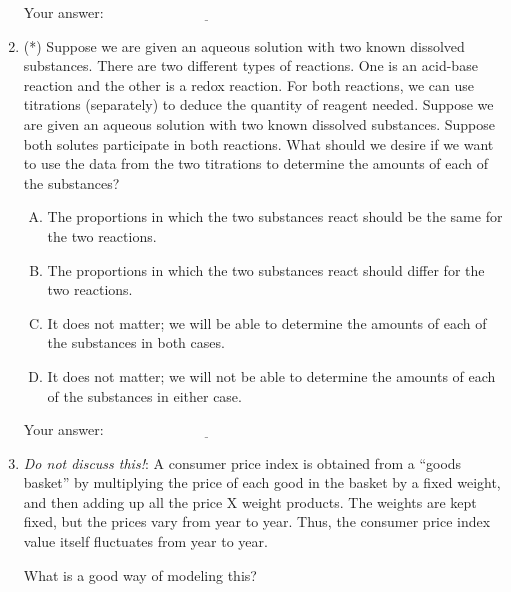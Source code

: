\documentclass[10pt]{amsart}
\begin{document}
\begin{enumerate}
  \vspace{0.1in}
  Your answer: $\underline{\qquad\qquad\qquad\qquad\qquad\qquad\qquad}$
  \vspace{0.1in}

\item (*) Suppose we are given an aqueous solution with two known
  dissolved substances. There are two different types of
  reactions. One is an acid-base reaction and the other is a redox
  reaction. For both reactions, we can use titrations (separately) to
  deduce the quantity of reagent needed. Suppose we are given an
  aqueous solution with two known dissolved substances. Suppose both
  solutes participate in both reactions. What should we desire if we
  want to use the data from the two titrations to determine the
  amounts of each of the substances?

  \begin{enumerate}[(A)]
  \item The proportions in which the two substances react should be
    the same for the two reactions.
  \item The proportions in which the two substances react should
    differ for the two reactions.
  \item It does not matter; we will be able to determine the amounts
    of each of the substances in both cases.
  \item It does not matter; we will not be able to determine the
    amounts of each of the substances in either case.
  \end{enumerate}

  \vspace{0.1in}
  Your answer: $\underline{\qquad\qquad\qquad\qquad\qquad\qquad\qquad}$
  \vspace{0.1in}

\item {\em Do not discuss this!}: A consumer price index is obtained
  from a ``goods basket'' by multiplying the price of each good in the
  basket by a fixed weight, and then adding up all the price X weight
  products. The weights are kept fixed, but the prices vary from year
  to year. Thus, the consumer price index value itself fluctuates from
  year to year.
  
  What is a good way of modeling this?


\end{enumerate}
\end{document}
